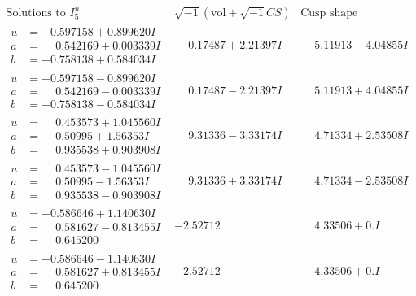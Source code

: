 \documentclass[1p]{elsarticle_modified}
\theoremstyle{definition}
\newcommand{\I}{\sqrt{-1}}
\begin{document}
$$\begin{array}{c|c|c}  
\text{Solutions to }I^u_{5}& \I (\text{vol} + \sqrt{-1}CS) & \text{Cusp shape}\\
 \hline 
\begin{aligned}
u &= -0.597158 + 0.899620 I \\
a &= \phantom{-}0.542169 + 0.003339 I \\
b &= -0.758138 + 0.584034 I\end{aligned}
 & \phantom{-}0.17487 + 2.21397 I & \phantom{-}5.11913 - 4.04855 I \\ \hline\begin{aligned}
u &= -0.597158 - 0.899620 I \\
a &= \phantom{-}0.542169 - 0.003339 I \\
b &= -0.758138 - 0.584034 I\end{aligned}
 & \phantom{-}0.17487 - 2.21397 I & \phantom{-}5.11913 + 4.04855 I \\ \hline\begin{aligned}
u &= \phantom{-}0.453573 + 1.045560 I \\
a &= \phantom{-}0.50995 + 1.56353 I \\
b &= \phantom{-}0.935538 + 0.903908 I\end{aligned}
 & \phantom{-}9.31336 - 3.33174 I & \phantom{-}4.71334 + 2.53508 I \\ \hline\begin{aligned}
u &= \phantom{-}0.453573 - 1.045560 I \\
a &= \phantom{-}0.50995 - 1.56353 I \\
b &= \phantom{-}0.935538 - 0.903908 I\end{aligned}
 & \phantom{-}9.31336 + 3.33174 I & \phantom{-}4.71334 - 2.53508 I \\ \hline\begin{aligned}
u &= -0.586646 + 1.140630 I \\
a &= \phantom{-}0.581627 - 0.813455 I \\
b &= \phantom{-}0.645200\phantom{ +0.000000I}\end{aligned}
 & -2.52712\phantom{ +0.000000I} & \phantom{-}4.33506 + 0. I\phantom{ +0.000000I} \\ \hline\begin{aligned}
u &= -0.586646 - 1.140630 I \\
a &= \phantom{-}0.581627 + 0.813455 I \\
b &= \phantom{-}0.645200\phantom{ +0.000000I}\end{aligned}
 & -2.52712\phantom{ +0.000000I} & \phantom{-}4.33506 + 0. I\phantom{ +0.000000I} \\ \hline\begin{aligned}

\end{aligned}
\end{array}$$
\end{document}
